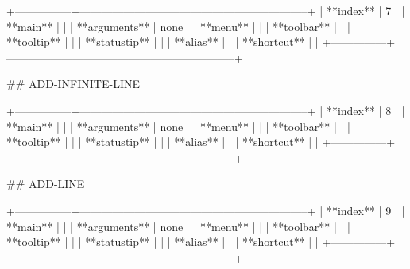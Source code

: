 +---------------+--------------------------------------------------------------+
| **index**     | 7                                                            |
| **main**      |                                                              |
| **arguments** | none                                                         |
| **menu**      |                                                              |
| **toolbar**   |                                                              |
| **tooltip**   |                                                              |
| **statustip** |                                                              |
| **alias**     |                                                              |
| **shortcut**  |                                                              |
+---------------+--------------------------------------------------------------+

## ADD-INFINITE-LINE

+---------------+--------------------------------------------------------------+
| **index**     | 8                                                            |
| **main**      |                                                              |
| **arguments** | none                                                         |
| **menu**      |                                                              |
| **toolbar**   |                                                              |
| **tooltip**   |                                                              |
| **statustip** |                                                              |
| **alias**     |                                                              |
| **shortcut**  |                                                              |
+---------------+--------------------------------------------------------------+


## ADD-LINE

+---------------+--------------------------------------------------------------+
| **index**     | 9                                                            |
| **main**      |                                                              |
| **arguments** | none                                                         |
| **menu**      |                                                              |
| **toolbar**   |                                                              |
| **tooltip**   |                                                              |
| **statustip** |                                                              |
| **alias**     |                                                              |
| **shortcut**  |                                                              |
+---------------+--------------------------------------------------------------+


